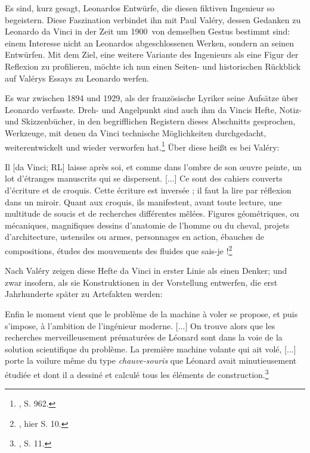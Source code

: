 \documentclass[%
	fontsize=10pt,%
	twoside,%
	headings=optiontoheadandtoc,%
	showtrims]{scrbook}
\renewenvironment{quote}{%
  \addmargin[\genericindent]{0pt}%
  \KOMAoptions{parskip=true}%
  \ifdim\parskip>0pt\else\addvspace{\intextsep}\fi
}{%
  \par
  \endaddmargin\vspace{\intextsep}
}
\renewcommand{\texttt}{\nohyphens} %
\begin{document}
\par Es sind, kurz gesagt, Leonardos Entwürfe, die diesen fiktiven Ingenieur so begeistern. Diese Faszination verbindet ihn mit Paul Valéry, dessen Gedanken zu Leonardo da Vinci in der Zeit um \texttt{1900~von} demselben Gestus bestimmt sind: einem Interesse nicht an Leonardos abgeschlossenen Werken, sondern an seinen Entwürfen. Mit dem Ziel, eine weitere Variante des Ingenieurs als eine Figur der Reflexion zu profilieren, möchte ich nun einen Seiten- und historischen Rückblick auf Valérys Essays zu Leonardo werfen.\par Es war zwischen 1894 und 1929, als der französische Lyriker seine Aufsätze über Leonardo verfasste. Dreh- und Angelpunkt sind auch ihm da Vincis Hefte, Notiz- und Skizzenbücher, in den begrifflichen Registern dieses Abschnitts gesprochen, Werkzeuge, mit denen da Vinci technische Möglichkeiten durchgedacht, weiterentwickelt und wieder verworfen hat.\footnote{\cite[][]{popplow2007a}, S. 962.}  Über diese heißt es bei Valéry:\begin{quote}
\par Il {[}da Vinci; RL{]} laisse après soi, et comme dans l\textquoteright{}ombre de son œuvre peinte, un lot d\textquoteright{}étranges manuscrits qui se dispersent. {[}...{]} Ce sont des cahiers couverts d\textquoteright{}écriture et de croquis. Cette écriture est inversée ; il faut la lire par réflexion dans un miroir. Quant aux croquis, ils manifestent, avant toute lecture, une multitude de soucis et de recherches différentes mêlées. Figures géométriques, ou mécaniques, magnifiques dessins d\textquoteright{}anatomie de l\textquoteright{}homme ou du cheval, projets d\textquoteright{}architecture, ustensiles ou armes, personnages en action, ébauches de compositions, études des mouvements des fluides \textendash{} que sais-je !\footnote{\cite[][]{val1942a}, hier S. 10.} 
\end{quote}
\par Nach Valéry zeigen diese Hefte da Vinci in erster Linie als einen Denker; und zwar insofern, als sie Konstruktionen in der Vorstellung entwerfen, die erst Jahrhunderte später zu Artefakten werden:\begin{quote}
\par Enfin le moment vient que le problème de la machine à voler se propose, et puis s\textquoteright{}impose, à l\textquoteright{}ambition de l\textquoteright{}ingénieur moderne. {[}...{]} On trouve alors que les recherches merveilleusement prématurées de Léonard sont dans la voie de la solution scientifique du problème. La première machine volante qui ait volé, {[}...{]} porte la voilure même du type \emph{chauve-souris} que Léonard avait minutieusement étudiée et dont il a dessiné et calculé tous les éléments de construction.\footnote{\cite[][]{val1942a}, S. 11.} 
\end{quote}
\end{document}
